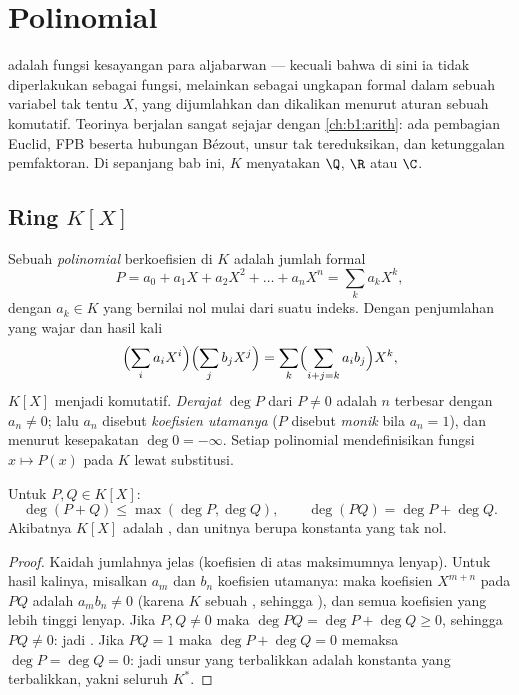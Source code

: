 \chapter{Polinomial}\label{ch:b1:poly}

 adalah fungsi kesayangan para aljabarwan --- kecuali bahwa
di sini ia tidak diperlakukan sebagai fungsi, melainkan sebagai ungkapan formal dalam
sebuah variabel tak tentu $X$, yang dijumlahkan dan dikalikan menurut aturan sebuah
 komutatif. Teorinya berjalan sangat sejajar dengan
\cref{ch:b1:arith}: ada pembagian Euclid, FPB beserta hubungan Bézout,
unsur tak tereduksikan, dan ketunggalan pemfaktoran. Di sepanjang bab ini, $K$
menyatakan $\Q$, $\R$ atau $\C$.

\section{Ring $K[X]$}

\begin{definition}\label{def:b1:poly:def}
Sebuah \emph{polinomial} berkoefisien di $K$ adalah
jumlah formal
\[
P = a_0 + a_1 X + a_2 X^2 + \dots + a_n X^n
= \sum_{k} a_k X^k,
\]
dengan $a_k \in K$ yang bernilai nol mulai dari suatu indeks. Dengan penjumlahan
yang wajar dan hasil kali
\[
\Bigl(\sum_i a_i X^i\Bigr)\Bigl(\sum_j b_j X^j\Bigr)
= \sum_k \Bigl(\sum_{i+j=k} a_i b_j\Bigr) X^k,
\]
 $K[X]$ menjadi  komutatif. \emph{Derajat} $\deg P$ dari
$P \neq 0$ adalah $n$ terbesar dengan $a_n \neq 0$; lalu $a_n$ disebut
\emph{koefisien utamanya} ($P$ disebut \emph{monik} bila $a_n = 1$), dan menurut kesepakatan $\deg 0 = -\infty$.
Setiap polinomial mendefinisikan fungsi $x \mapsto P(x)$ pada $K$ lewat
substitusi.
\end{definition}

\begin{proposition}\label{prop:b1:poly:degree}
Untuk $P, Q \in K[X]$:
\[
\deg(P + Q) \leq \max(\deg P, \deg Q),
\qquad
\deg(PQ) = \deg P + \deg Q .
\]
Akibatnya $K[X]$ adalah , dan unitnya berupa
konstanta yang tak nol.
\end{proposition}

\begin{proof}
Kaidah jumlahnya jelas (koefisien di atas maksimumnya lenyap). Untuk
hasil kalinya, misalkan $a_m$ dan $b_n$ koefisien utamanya: maka
koefisien $X^{m+n}$ pada $PQ$ adalah $a_m b_n \neq 0$ (karena $K$ sebuah
, sehingga ), dan semua koefisien yang lebih tinggi lenyap.
Jika $P, Q \neq 0$ maka $\deg PQ = \deg P + \deg Q \geq 0$, sehingga $PQ \neq
0$: jadi . Jika $PQ = 1$ maka $\deg P + \deg Q = 0$ memaksa
$\deg P = \deg Q = 0$: jadi unsur yang terbalikkan adalah konstanta yang
terbalikkan, yakni seluruh $K^*$.
\end{proof}

